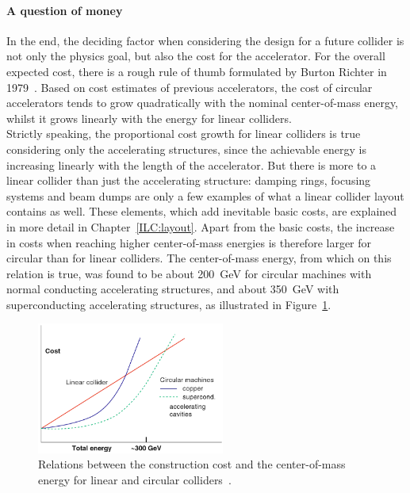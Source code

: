 \paragraph{A question of money}
In the end, the deciding factor when considering the design for a future collider is not only the physics goal, but also the cost for the accelerator.
For the overall expected cost, there is a rough rule of thumb formulated by Burton Richter in 1979~\cite[p. 87ff]{Richter}.
Based on cost estimates of previous accelerators, the cost of circular accelerators tends to grow quadratically with the nominal center-of-mass energy, whilst it grows linearly with the energy for linear colliders.
\\Strictly speaking, the proportional cost growth for linear colliders is true considering only the accelerating structures, since the achievable energy is increasing linearly with the length of the accelerator.
But there is more to a linear collider than just the accelerating structure: damping rings, focusing systems and beam dumps are only a few examples of what a linear collider layout contains as well.
These elements, which add inevitable basic costs, are explained in more detail in Chapter~\ref{ILC:layout}.
Apart from the basic costs, the increase in costs when reaching higher center-of-mass energies is therefore larger for circular than for linear colliders.
The center-of-mass energy, from which on this relation is true,  was found to be about \SI{200}{\GeV} for circular machines with normal conducting accelerating structures, and about \SI{350}{\GeV} with superconducting accelerating structures, as illustrated in Figure~\ref{fig:Costs}.
\begin{figure}[h]
\centering
\includegraphics[width=0.55\textwidth]{Figures/Collider_costs.png}
\caption[Construction cost of linear and circular colliders]{Relations between the construction cost and the center-of-mass energy for linear and circular \positron\electron colliders~\cite[p. 13]{Schopper}.}
\label{fig:Costs}
\end{figure}